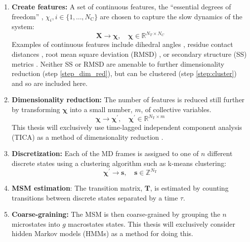 \begin{enumerate}
    \item \textbf{Create features:} A set of continuous features, the ``essential degrees of freedom'' \cite{schutteDirectApproachConformational1999}, $\chi_{i}, i \in \{1,\dots, N_{\mathrm{C}} \}$ are chosen to capture the slow dynamics of the system:
    \begin{equation*}
        \mathbf{X}  \rightarrow \bm{\chi},\quad \bm{\chi} \in \mathbb{R}^{N_{T} \times N_{C}}
    \end{equation*}
    Examples of continuous features include dihedral angles \cite{noeHierarchicalAnalysisConformational2007,choderaLongTimeProtein2006a,kubeCoarseGrainingMethod2007b,bucheteCoarseMasterEquations2008a}, residue contact distances \cite{stanleyKineticModulationDisordered2014,zhouDistributionReciprocalInteratomic2012,shuklaConformationalHeterogeneityCalmodulin2016}, root mean square deviation (RMSD) \cite{noe2009constructing,bowmanAtomisticFoldingSimulations2011a}, or secondary structure (SS) metrics \cite{muffKineticAnalysisMolecular2008}. Neither SS or RMSD are amenable to further dimensionality reduction (step \ref{step_dim_red}), but can be clustered (step \ref{step:cluster}) and so are included here. 
    \item \textbf{Dimensionality reduction:} The number of features is reduced still further by transforming $\bm{\chi}$ into a small number, $m$, of collective variables. 
    \begin{equation*}
        \bm{\chi}  \rightarrow \bm{\chi}^{\prime},\quad \bm{\chi}^{\prime} \in \mathbb{R}^{N_{\mathrm{T}} \times m}
    \end{equation*}
    This thesis will exclusively use time-lagged independent component analysis (TICA)  as a method of dimensionality reduction \cite{perez-hernandezIdentificationSlowMolecular2013a} \cite{schwantesImprovementsMarkovState2013}.\label{step_dim_red}
    \item \textbf{Discretization:} Each of the MD frames is assigned to one of $n$ different discrete states using a clustering algorithm such as k-means \cite{lloydLeastSquaresQuantization1982} clustering: 
    \begin{equation*}
        \bm{\chi}^{\prime} \rightarrow \mathbf{s},\quad \mathbf{s} \in \mathbb{Z}^{N_{\mathrm{T}}}
    \end{equation*}\label{step:cluster}
    \item \textbf{MSM estimation}: The transition matrix, $\mathbf{T}$, is estimated by counting transitions between discrete states separated by a time $\tau$. 
    \item \textbf{Coarse-graining:} The MSM is then coarse-grained by grouping the $n$ microstates into $g$ macrostates states. This thesis will exclusively consider hidden Markov models (HMMs) as a method for doing this. 
\end{enumerate}

